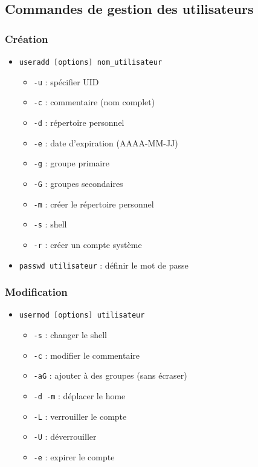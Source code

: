 \documentclass[12pt,a4paper]{article}
\begin{document}
\subsection{Commandes de gestion des utilisateurs}

\subsubsection{Cr\'eation}
\begin{itemize}
    \item \texttt{useradd [options] nom\_utilisateur}
    \begin{itemize}
        \item \texttt{-u} : sp\'ecifier UID
        \item \texttt{-c} : commentaire (nom complet)
        \item \texttt{-d} : r\'epertoire personnel
        \item \texttt{-e} : date d'expiration (AAAA-MM-JJ)
        \item \texttt{-g} : groupe primaire
        \item \texttt{-G} : groupes secondaires
        \item \texttt{-m} : cr\'eer le r\'epertoire personnel
        \item \texttt{-s} : shell
        \item \texttt{-r} : cr\'eer un compte syst\`eme
    \end{itemize}
    \item \texttt{passwd utilisateur} : d\'efinir le mot de passe
\end{itemize}

\subsubsection{Modification}
\begin{itemize}
    \item \texttt{usermod [options] utilisateur}
    \begin{itemize}
        \item \texttt{-s} : changer le shell
        \item \texttt{-c} : modifier le commentaire
        \item \texttt{-aG} : ajouter \`a des groupes (sans \'ecraser)
        \item \texttt{-d -m} : d\'eplacer le home
        \item \texttt{-L} : verrouiller le compte
        \item \texttt{-U} : d\'everrouiller
        \item \texttt{-e} : expirer le compte
    \end{itemize}
\end{itemize}
\end{document}
